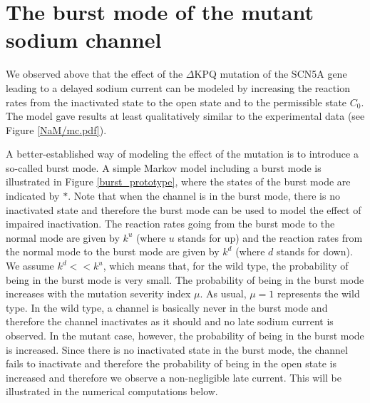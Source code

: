 
\chapter[The burst mode]{The burst mode of the mutant sodium channel \label{burst_chap}}

We observed above that the effect of the $\Delta$KPQ mutation of the SCN5A
gene leading to a delayed sodium current can be modeled by increasing the
reaction rates from the inactivated state to the open state and to the
permissible state $C_{0}$. The model gave results at least qualitatively 
similar to the experimental data (see Figure \ref{NaM/mc.pdf}). 

A better-established way of
modeling the effect of the mutation is to introduce a so-called burst mode.
A simple Markov model including a burst mode is illustrated in Figure \ref{burst_prototype}, where the states of the burst mode
are indicated by $\ast$. Note that when the channel is in the burst mode,
there is no inactivated state and therefore the burst mode can be used to model the effect of impaired inactivation.
The reaction rates going from the burst mode to
the normal mode are given by $k^{u}$ (where $u$ stands for up) and the reaction rates from the normal mode
to the burst mode are given by $k^{d}$
(where $d$ stands for down). We assume $k^{d}<<k^{u}$, which means that, for the wild type, 
the probability of being in the burst mode is very small. The probability
of being in the burst mode increases with the mutation severity index $\mu$.
As usual, $\mu=1$ represents the wild type. In the wild type, a channel is basically never in the burst mode and therefore the channel inactivates as it should and no late sodium current is observed. In the mutant case, however, the probability of being in the burst mode is increased. Since there is no inactivated state in the burst mode, the channel fails to inactivate and therefore the probability of being in the open state is increased and therefore we observe a non-negligible late current. This will be illustrated in the numerical computations below.

